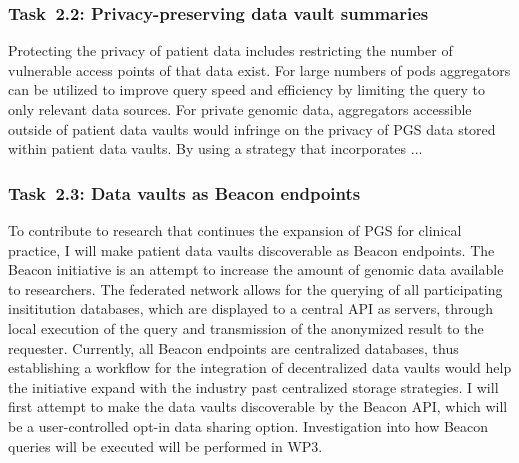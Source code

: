 \documentclass[a4paper,11pt]{article}
\begin{document}
\begin{refsection}

\newcommand\WPbb{Privacy-preserving data vault summaries}
\subsubsection{Task~2.2: \WPbb}

Protecting the privacy of patient data includes restricting the number of vulnerable access points of that data exist.
For large numbers of pods aggregators can be utilized to improve query speed and efficiency by limiting the query to only relevant data sources.
For private genomic data, aggregators accessible outside of patient data vaults would infringe on the privacy of PGS data stored within patient data vaults.
By using a strategy that incorporates ...

\newcommand\WPbc{Data vaults as Beacon endpoints}
\subsubsection{Task~2.3: \WPbc}

To contribute to research that continues the expansion of PGS for clinical practice, I will make patient data vaults discoverable as Beacon endpoints.
The Beacon initiative is an attempt to increase the amount of genomic data available to researchers.
The federated network allows for the querying of all participating insititution databases, which are displayed to a central API as servers, through local execution of the query and transmission of the anonymized result to the requester.
Currently, all Beacon endpoints are centralized databases, thus establishing a workflow for the integration of decentralized data vaults would help the initiative expand with the industry past centralized storage strategies.
I will first attempt to make the data vaults discoverable by the Beacon API, which will be a user-controlled opt-in data sharing option.
Investigation into how Beacon queries will be executed will be performed in WP3.



\end{refsection}
\end{document}
